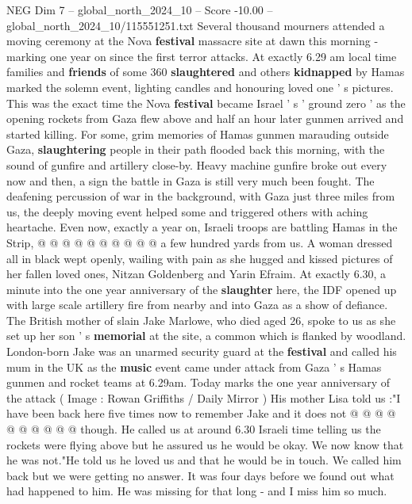 \begin{textsample}{NEG Dim 7 – global\_north\_2024\_10 – Score -10.00 – global\_north\_2024\_10/115551251.txt}  \label{ex:f7_neg_040}
Several thousand mourners attended a moving ceremony at the Nova \textbf{festival} massacre site at dawn this morning - marking one year on since the first terror attacks.
At exactly 6.29 am local time families and \textbf{friends} of some 360 \textbf{slaughtered} and others \textbf{kidnapped} by Hamas marked the solemn event, lighting candles and honouring loved one ' s pictures.
This was the exact time the Nova \textbf{festival} became Israel ' s ' ground zero ' as the opening rockets from Gaza flew above and half an hour later gunmen arrived and started killing.
For some, grim memories of Hamas gunmen marauding outside Gaza, \textbf{slaughtering} people in their path flooded back this morning, with the sound of gunfire and artillery close-by.
Heavy machine gunfire broke out every now and then, a sign the battle in Gaza is still very much been fought.
The deafening percussion of war in the background, with Gaza just three miles from us, the deeply moving event helped some and triggered others with aching heartache.
Even now, exactly a year on, Israeli troops are battling Hamas in the Strip, @ @ @ @ @ @ @ @ @ @ a few hundred yards from us.
A woman dressed all in black wept openly, wailing with pain as she hugged and kissed pictures of her fallen loved ones, Nitzan Goldenberg and Yarin Efraim.
At exactly 6.30, a minute into the one year anniversary of the \textbf{slaughter} here, the IDF opened up with large scale artillery fire from nearby and into Gaza as a show of defiance.
The British mother of slain Jake Marlowe, who died aged 26, spoke to us as she set up her son ' s \textbf{memorial} at the site, a common which is flanked by woodland.
London-born Jake was an unarmed security guard at the \textbf{festival} and called his mum in the UK as the \textbf{music} event came under attack from Gaza ' s Hamas gunmen and rocket teams at 6.29am.
Today marks the one year anniversary of the attack ( Image : Rowan Griffiths / Daily Mirror ) His mother Lisa told us :"I have been back here five times now to remember Jake and it does not @ @ @ @ @ @ @ @ @ @ though.
He called us at around 6.30 Israeli time telling us the rockets were flying above but he assured us he would be okay.
We now know that he was not."He told us he loved us and that he would be in touch.
We called him back but we were getting no answer.
It was four days before we found out what had happened to him.
He was missing for that long - and I miss him so much.

\end{textsample}
